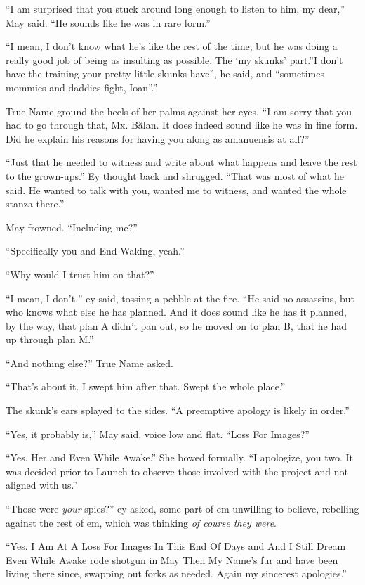 ``I am surprised that you stuck around long enough to listen to him, my dear,'' May said. ``He sounds like he was in rare form.''

``I mean, I don't know what he's like the rest of the time, but he was doing a really good job of being as insulting as possible. The `my skunks' part.''I don't have the training your pretty little skunks have'', he said, and ``sometimes mommies and daddies fight, Ioan''.''

True Name ground the heels of her palms against her eyes. ``I am sorry that you had to go through that, Mx. Bălan. It does indeed sound like he was in fine form. Did he explain his reasons for having you along as amanuensis at all?''

``Just that he needed to witness and write about what happens and leave the rest to the grown-ups.'' Ey thought back and shrugged. ``That was most of what he said. He wanted to talk with you, wanted me to witness, and wanted the whole stanza there.''

May frowned. ``Including me?''

``Specifically you and End Waking, yeah.''

``Why would I trust him on that?''

``I mean, I don't,'' ey said, tossing a pebble at the fire. ``He said no assassins, but who knows what else he has planned. And it does sound like he has it planned, by the way, that plan A didn't pan out, so he moved on to plan B, that he had up through plan M.''

``And nothing else?'' True Name asked.

``That's about it. I swept him after that. Swept the whole place.''

The skunk's ears splayed to the sides. ``A preemptive apology is likely in order.''

``Yes, it probably is,'' May said, voice low and flat. ``Loss For Images?''

``Yes. Her and Even While Awake.'' She bowed formally. ``I apologize, you two. It was decided prior to Launch to observe those involved with the project and not aligned with us.''

``Those were \emph{your} spies?'' ey asked, some part of em unwilling to believe, rebelling against the rest of em, which was thinking \emph{of course they were}.

``Yes. I Am At A Loss For Images In This End Of Days and And I Still Dream Even While Awake rode shotgun in May Then My Name's fur and have been living there since, swapping out forks as needed. Again my sincerest apologies.''

